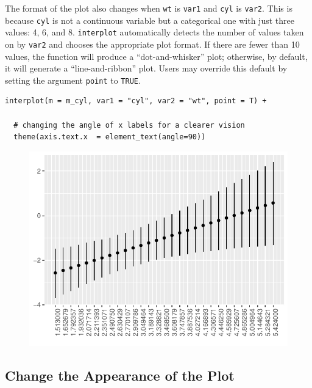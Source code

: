 \documentclass[
  article]{jss}
\begin{document}
The format of the plot also changes when \texttt{wt} is \texttt{var1}
and \texttt{cyl} is \texttt{var2}. This is because \texttt{cyl} is not a
continuous variable but a categorical one with just three values: 4, 6,
and 8. \texttt{interplot} automatically detects the number of values
taken on by \texttt{var2} and chooses the appropriate plot format. If
there are fewer than 10 values, the function will produce a
``dot-and-whisker'' plot; otherwise, by default, it will generate a
``line-and-ribbon'' plot. Users may override this default by setting the
argument \texttt{point} to \texttt{TRUE}.

\begin{verbatim}
interplot(m = m_cyl, var1 = "cyl", var2 = "wt", point = T) +

  # changing the angle of x labels for a clearer vision
  theme(axis.text.x  = element_text(angle=90))
\end{verbatim}

\begin{figure}[H]

{\centering \includegraphics{jss_manuscript_files/figure-pdf/unnamed-chunk-6-1.pdf}

}

\end{figure}

\hypertarget{sec-change-the-appearance-of-the-plot}{%
\subsection{Change the Appearance of the
Plot}\label{sec-change-the-appearance-of-the-plot}}
\end{document}
